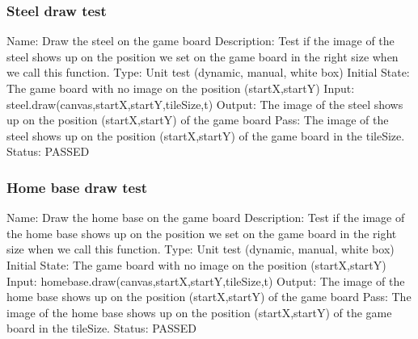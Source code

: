 \documentclass{article}
\begin{document}
\subsubsection{Steel draw test}
\label{sec:3.2.5}
Name:  Draw the steel on the game board\newline
Description: Test if the image of the steel shows up on the position we set on 
the game board in the right size when we call this function. \newline
Type: Unit test (dynamic, manual, white box) \newline
Initial State:  The game board with no image on the position (startX,startY) 
\newline
Input: steel.draw(canvas,startX,startY,tileSize,t)\newline
Output: The image of the steel shows up on the position (startX,startY) of the
 game board\newline
Pass:  The image of the steel shows up on the position (startX,startY) of the 
game board in the tileSize. \newline
\newline Status: PASSED

\subsubsection{Home base draw test}
\label{sec:3.2.6}
Name:  Draw the home base on the game board\newline
Description: Test if the image of the home base shows up on the position we 
set on the game board in the right size when we call this function. \newline
Type: Unit test (dynamic, manual, white box) \newline
Initial State:  The game board with no image on the position (startX,startY) 
\newline
Input: homebase.draw(canvas,startX,startY,tileSize,t)\newline
Output: The image of the home base shows up on the position (startX,startY) of
 the game board\newline
Pass:  The image of the home base shows up on the position (startX,startY) of 
the game board in the tileSize. \newline
\newline Status: PASSED
\end{document}
